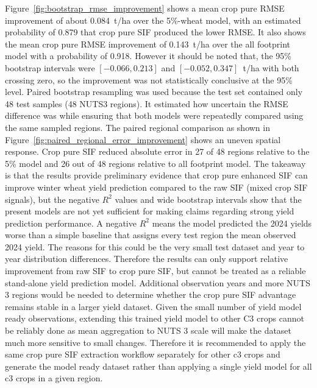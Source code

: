Figure~\ref{fig:bootstrap_rmse_improvement} shows a mean crop pure RMSE improvement of about 0.084~t/ha over the 5\%-wheat model, with an estimated probability of 0.879 that crop pure SIF produced the lower RMSE. It also shows the mean crop pure RMSE improvement of 0.143~t/ha over the all footprint model with a probability of 0.918. However it should be noted that, the 95\% bootstrap intervals were $[-0.066,0.213]$ and $[-0.052,0.347]$~t/ha with both crossing zero, so the improvement was not statistically conclusive at the 95\% level. Paired bootstrap resampling was used because the test set contained only 48 test samples (48 NUTS3 regions). It estimated how uncertain the RMSE difference was while ensuring that both models were repeatedly compared using the same sampled regions. The paired regional comparison as shown in Figure~\ref{fig:paired_regional_error_improvement} shows an uneven spatial response. Crop pure SIF reduced absolute error in 27 of 48 regions relative to the 5\% model and 26 out of 48 regions relative to all footprint model. The takeaway is that the results provide preliminary evidence that crop pure enhanced SIF can improve winter wheat yield prediction compared to the raw SIF (mixed crop SIF signals), but the negative $R^2$ values and wide bootstrap intervals show that the present models are not yet sufficient for making claims regarding strong yield prediction performance. A negative $R^2$ means the model predicted the 2024 yields worse than a simple baseline that assigns every test region the mean observed 2024 yield. The reasons for this could be the very small test dataset and year to year distribution differences. Therefore the results can only support relative improvement from raw SIF to crop pure SIF, but cannot be treated as a reliable stand-alone yield prediction model. Additional observation years and more NUTS 3 regions would be needed to determine whether the crop pure SIF advantage remains stable in a larger yield dataset. Given the small number of yield model ready observations, extending this trained yield model to other C3 crops cannot be reliably done as mean aggregation to NUTS 3 scale will make the dataset much more sensitive to small changes. Therefore it is recommended to apply the same crop pure SIF extraction workflow separately for other c3 crops and generate the model ready dataset rather than applying a single yield model for all c3 crops in a given region. 


